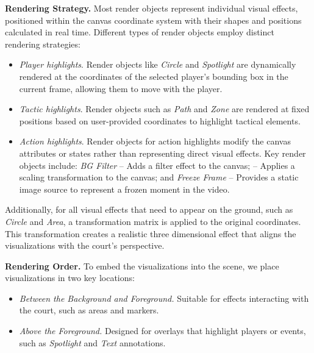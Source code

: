 
\setlength{\itemsep}{0pt} %
\setlength{\parskip}{0pt} %
\setlength{\topsep}{0pt}  %

\vspace{1mm}
\noindent\textbf{Rendering Strategy.}
Most render objects represent individual visual effects, positioned within the canvas coordinate system with their shapes and positions calculated in real time. Different types of render objects employ distinct rendering strategies:
\begin{itemize}[leftmargin=*]
    \item \emph{Player highlights}. 
    Render objects like \textit{Circle} and \textit{Spotlight} are dynamically rendered at the coordinates of the selected player's bounding box in the current frame, allowing them to move with the player.

    \item \emph{Tactic highlights}. 
    Render objects such as \textit{Path} and \textit{Zone} are rendered at fixed positions based on user-provided coordinates to highlight tactical elements.

    \item \emph{Action highlights}. Render objects for action highlights modify the canvas attributes or states rather than representing direct visual effects. Key render objects include: \emph{BG Filter} -- Adds a filter effect to the canvas; \Zoom{} -- Applies a scaling transformation to the canvas; and \emph{Freeze Frame} -- Provides a static image source to represent a frozen moment in the video.
    
\end{itemize}

Additionally, for all visual effects that need to appear on the ground, such as \textit{Circle} and \textit{Area}, a transformation matrix is applied to the original coordinates. 
This transformation creates a realistic three dimensional effect that aligns the visualizations with the court's perspective.

\vspace{1mm}
\noindent\textbf{Rendering Order.} 
To embed the visualizations into the scene, we place visualizations in two key locations:
\begin{itemize} [leftmargin=*]
    \item \emph{Between the Background and Foreground.} Suitable for effects interacting with the court, such as areas and markers.
    \item \emph{Above the Foreground.} Designed for overlays that highlight players or events, such as \textit{Spotlight} and \textit{Text} annotations.
    
\end{itemize}

